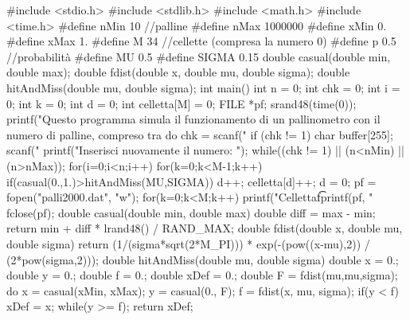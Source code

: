 \documentclass[10pt,oneside,a4paper]{article}
\begin{document}
\begin{codice_c}[caption={Simulazione di un pallinometro con distribuzione gaussiana della probabilità di cadere a destra per ogni chiodo}, label={list:codice}][H]
#include <stdio.h>
#include <stdlib.h>
#include <math.h>
#include <time.h>
#define nMin 10 //palline
#define nMax 1000000
#define xMin 0.
#define xMax 1.
#define M 34 //cellette (compresa la numero 0)
#define p 0.5 //probabilità
#define MU 0.5
#define SIGMA 0.15
double casual(double min, double max);
double fdist(double x, double mu, double sigma);
double hitAndMiss(double mu, double sigma);
int main() {
  int n = 0;
  int chk = 0;
  int i = 0;
  int k = 0;
  int d = 0;
  int celletta[M] = {0};
  FILE *pf;
  srand48(time(0));
  printf("Questo programma simula il funzionamento di un
pallinometro con %
il numero di palline, compreso tra %
  do {
  chk = scanf("%
  if (chk != 1) {
    char buffer[255];
    scanf("%
    printf("Inserisci nuovamente il numero: ");
  }
  } while((chk != 1) || (n<nMin) || (n>nMax));
  for(i=0;i<n;i++) {
    for(k=0;k<M-1;k++) {
      if(casual(0.,1.)>hitAndMiss(MU,SIGMA)) {
        d++;
} }
    celletta[d]++;
d = 0; }
  pf = fopen("palli2000.dat", "w");
for(k=0;k<M;k++) {
    printf("Celletta\t%
    fprintf(pf, "%
}
  fclose(pf);
}
double casual(double min, double max) {
  double diff = max - min;
  return min + diff * lrand48() / RAND_MAX;
}
double fdist(double x, double mu, double sigma) {
  return (1/(sigma*sqrt(2*M_PI))) * exp(-(pow((x-mu),2)) /
(2*pow(sigma,2)));
}
double hitAndMiss(double mu, double sigma) {
  double x = 0.;
  double y = 0.;
  double f = 0.;
  double xDef = 0.;
  double F = fdist(mu,mu,sigma);
  do {
    x = casual(xMin, xMax);
    y = casual(0., F);
    f = fdist(x, mu, sigma);
    if(y < f) {
      xDef = x;
    }
  } while(y >= f);
  return xDef;
}
\end{codice_c}
\end{document}
